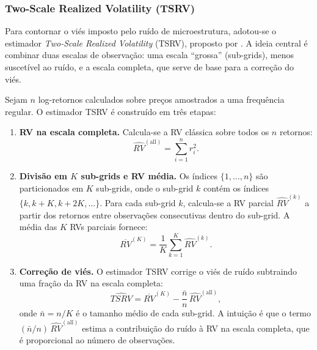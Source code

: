 \subsubsection{Two-Scale Realized Volatility (TSRV)}
\label{subsec:tsrv}

Para contornar o viés imposto pelo ruído de microestrutura, adotou-se o estimador \emph{Two-Scale Realized Volatility} (TSRV), proposto por . A ideia central é combinar duas escalas de observação: uma escala ``grossa'' (sub-grids), menos suscetível ao ruído, e a escala completa, que serve de base para a correção do viés.

Sejam $n$ log-retornos calculados sobre preços amostrados a uma frequência regular. O estimador TSRV é construído em três etapas:

\begin{enumerate}
    \item \textbf{RV na escala completa.} Calcula-se a RV clássica sobre todos os $n$ retornos:
    \begin{equation}
        \label{eq:rv_all}
        \widehat{RV}^{(\text{all})} = \sum_{i=1}^{n} r_i^2.
    \end{equation}

    \item \textbf{Divisão em $K$ sub-grids e RV média.} Os índices $\{1, \ldots, n\}$ são particionados em $K$ sub-grids, onde o sub-grid $k$ contém os índices $\{k, k+K, k+2K, \ldots\}$. Para cada sub-grid $k$, calcula-se a RV parcial $\widehat{RV}^{(k)}$ a partir dos retornos entre observações consecutivas dentro do sub-grid. A média das $K$ RVs parciais fornece:
    \begin{equation}
        \label{eq:rv_subgrid}
        \overline{RV}^{(K)} = \frac{1}{K}\sum_{k=1}^{K} \widehat{RV}^{(k)}.
    \end{equation}

    \item \textbf{Correção de viés.} O estimador TSRV corrige o viés de ruído subtraindo uma fração da RV na escala completa:
    \begin{equation}
        \label{eq:tsrv}
        \widehat{TSRV} = \overline{RV}^{(K)} - \frac{\bar{n}}{n}\,\widehat{RV}^{(\text{all})},
    \end{equation}
    onde $\bar{n} = n/K$ é o tamanho médio de cada sub-grid. A intuição é que o termo $(\bar{n}/n)\,\widehat{RV}^{(\text{all})}$ estima a contribuição do ruído à RV na escala completa, que é proporcional ao número de observações.
\end{enumerate}

